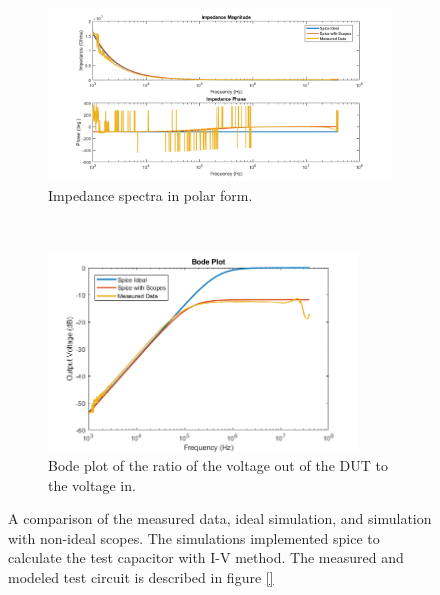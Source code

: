 \begin{figure}[H]
    \centering
    \begin{subfigure}[b]{\textwidth}
        \centering
        \includegraphics[width=\textwidth]{images/spice-measured-comp_mag-phase.png}
        \caption{Impedance spectra in polar form.}
    \end{subfigure}
    \\
    \vspace{0.1 in}
    \begin{subfigure}[b]{\textwidth}
        \centering
        \includegraphics[width=0.9\textwidth]{images/spice-measured-comp.png}
        \caption{Bode plot of the ratio of the voltage out of the DUT to the voltage in.}
    \end{subfigure}
    \caption[Comparison of measured and simulated response of test circuit.]{A comparison of the measured data, ideal simulation, and simulation with non-ideal scopes. The simulations implemented spice to calculate the test capacitor with I-V method. The measured and modeled test circuit is described in figure \ref{}}
    \label{fig:test_circuit_impedance_spectra}
\end{figure}

